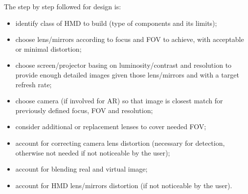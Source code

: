 The step by step followed for design is:
\begin{itemize}
\item identify class of HMD to build (type of components and its limits);
\item choose lens/mirrors according to focus and FOV to achieve, with acceptable or minimal distortion;
\item choose screen/projector basing on luminosity/contrast and resolution to provide enough detailed images given those lens/mirrors and with a target refresh rate;
\item choose camera (if involved for AR) so that image is closest match for previously defined focus, FOV and resolution;
\item consider additional or replacement lenses to cover needed FOV;
\item account for correcting camera lens distortion (necessary for detection, otherwise not needed if not noticeable by the user);
\item account for blending real and virtual image;
\item account for HMD lens/mirrors distortion (if not noticeable by the user).
\end{itemize}

